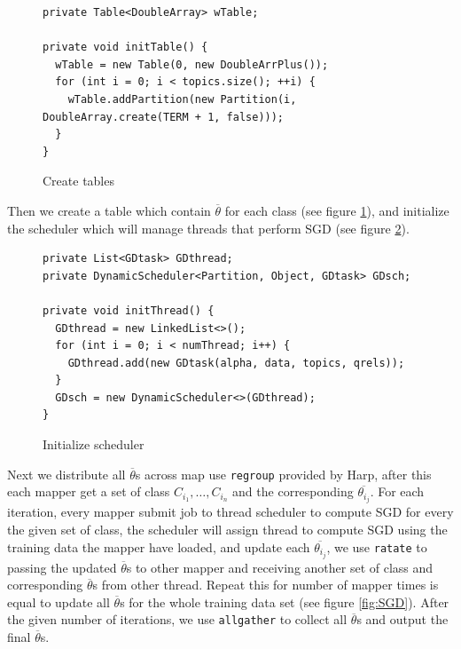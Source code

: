 \documentclass{sig-alternate-05-2015}
\begin{document}
\begin{figure}
\begin{lstlisting}
private Table<DoubleArray> wTable;
  
private void initTable() {
  wTable = new Table(0, new DoubleArrPlus());
  for (int i = 0; i < topics.size(); ++i) {
    wTable.addPartition(new Partition(i, DoubleArray.create(TERM + 1, false)));
  }
}
\end{lstlisting}
\caption{Create tables}
\label{fig:init}
\end{figure}

Then we create a table which contain $\overline{\theta}$ for each class (see figure \ref{fig:init}),
and initialize the scheduler which will manage threads that perform SGD (see figure \ref{fig:thread}).\par

\begin{figure}
\begin{lstlisting}
private List<GDtask> GDthread;
private DynamicScheduler<Partition, Object, GDtask> GDsch;

private void initThread() {
  GDthread = new LinkedList<>();
  for (int i = 0; i < numThread; i++) {
    GDthread.add(new GDtask(alpha, data, topics, qrels));
  }
  GDsch = new DynamicScheduler<>(GDthread);
}
\end{lstlisting}
\caption{Initialize scheduler}
\label{fig:thread}
\end{figure}


Next we distribute all $\overline{\theta}$s across map use \lstinline|regroup| provided by Harp,
after this each mapper get a set of class $C_{i_1},\ldots,C_{i_n}$ and the corresponding $\overline{\theta_{i_j}}$.
For each iteration, every mapper submit job to thread scheduler to compute SGD for every the given set of class,
the scheduler will assign thread to compute SGD using the training data the mapper have loaded,
and update each $\overline{\theta_{i_j}}$, we use \lstinline|ratate| to passing the updated $\overline{\theta}$s to other mapper and
receiving another set of class and corresponding $\overline{\theta}$s from other thread.
Repeat this for number of mapper times is equal to update all $\overline{\theta}$s for the whole training data set (see figure \ref{fig:SGD}).
After the given number of iterations, we use \lstinline|allgather| to collect all $\overline{\theta}$s and output the final $\overline{\theta}$s.
\end{document}

